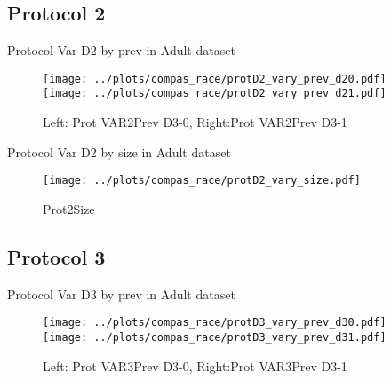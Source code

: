 \documentclass[10pt,a4paper]{article}
\begin{document}
\clearpage
\newpage
\subsection{Protocol 2}

\begin{table}[h!]

\caption{Protocol Var D2 by prev in Adult dataset}
\end{table}

\begin{figure}[h!]
\texttt{[image: ../plots/compas\_race/protD2\_vary\_prev\_d20.pdf]}
\texttt{[image: ../plots/compas\_race/protD2\_vary\_prev\_d21.pdf]}
\caption{Left: Prot VAR2Prev D3-0, Right:Prot VAR2Prev D3-1}
\end{figure}

\begin{table}[h!]

\caption{Protocol Var D2 by size in Adult dataset}
\end{table}

\begin{figure}[h!]
\center
\texttt{[image: ../plots/compas\_race/protD2\_vary\_size.pdf]}
\caption{Prot2Size}
\end{figure}

\clearpage
\newpage
\subsection{Protocol 3}

\begin{table}[h!]

\caption{Protocol Var D3 by prev in Adult dataset}
\end{table}

\begin{figure}[h!]
\texttt{[image: ../plots/compas\_race/protD3\_vary\_prev\_d30.pdf]}
\texttt{[image: ../plots/compas\_race/protD3\_vary\_prev\_d31.pdf]}
\caption{Left: Prot VAR3Prev D3-0, Right:Prot VAR3Prev D3-1}
\end{figure}
\end{document}
